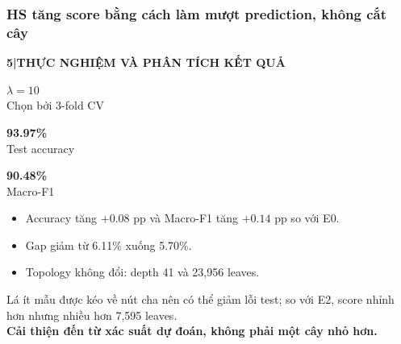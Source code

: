 \documentclass[aspectratio=169,12pt]{beamer}
\newcommand{\metric}[3]{%
  \begin{minipage}[t]{0.30\linewidth}
    \centering
    {\Large\bfseries\textcolor{#1}{#2}}\\[-0.15em]
    {\small #3}
  \end{minipage}%
}
\newcommand{\chaptertag}[2]{%
  \vspace{-0.16cm}%
  {\scriptsize\bfseries\textcolor{boxframe}{#1\enspace |\enspace #2}}\par
  \vspace{0.12cm}%
}
\begin{document}
\begin{frame}
  \frametitle{HS tăng score bằng cách làm mượt prediction, không cắt cây}
  \chaptertag{5}{THỰC NGHIỆM VÀ PHÂN TÍCH KẾT QUẢ}
  \vspace{0.18cm}
  \begin{center}
    \metric{boxframe}{$\lambda=10$}{Chọn bởi 3-fold CV}\hfill
    \metric{primaryblue}{93.97\%}{Test accuracy}\hfill
    \metric{successgreen}{90.48\%}{Macro-F1}
  \end{center}
  \vspace{0.45cm}
  \begin{itemize}
    \item Accuracy tăng $+0.08$ pp và Macro-F1 tăng $+0.14$ pp so với E0.
    \item Gap giảm từ 6.11\% xuống 5.70\%.
    \item Topology không đổi: depth 41 và 23,956 leaves.
  \end{itemize}
  \vspace{0.18cm}
  \centering
  \small
  Lá ít mẫu được kéo về nút cha nên có thể giảm lỗi test; so với E2, score nhỉnh hơn nhưng nhiều hơn 7,595 leaves.\\
  \textbf{Cải thiện đến từ xác suất dự đoán, không phải một cây nhỏ hơn.}
\end{frame}
\end{document}
